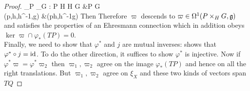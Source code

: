 \documentclass{article}
\begin{document}
\begin{proof}
{\mu_P \times \mu_G : P \times H \times H \times G &\to P \times G \\
(p,h,h^{-1},g) &\mapsto (ph,h^{-1}g)
}
Then 
Therefore $\varpi$ descends to $\varpi \in \Omega^1(P\times_H G,\mathfrak{g})$ and satisfies the properties of an Ehresmann connection which in addition obeys $\ker \varpi \cap \varphi_\ast(TP)=0 $. \\
Finally, we need to show that $\varphi^\ast$ and $j$ are mutual inverses:
shows that $\varphi^\ast \circ j = \operatorname{id}$. To do the other direction, it suffices to show $\varphi^\ast$ is injective. Now if $\varphi^\ast \varpi = \varphi^\ast \varpi_2$ then $\varpi_1,\varpi_2$ agree on the image $\varphi_\ast(TP)$ and hence on all the right translations. But $\varpi_1, \varpi_2$ agree on $\xi_X$ and these two kinds of vectors span $TQ$
\end{proof}
\end{document}
